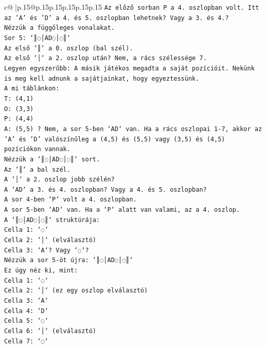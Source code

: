 \documentclass{article}
\begin{document}
{\begin{supertabular}{c@{$\;$}|p{.15\linewidth}@{}p{.15\linewidth}p{.15\linewidth}p{.15\linewidth}p{.15\linewidth}p{.15\linewidth}}
{{{\texttt{Az előző sorban P a 4. oszlopban volt. Itt az 'A' és 'D' a 4. és 5. oszlopban lehetnek? Vagy a 3. és 4.?} \\
\texttt{Nézzük a függőleges vonalakat.} \\
\texttt{Sor 5: `║◌│AD◌│◌║`} \\
\texttt{Az első `║` a 0. oszlop (bal szél).} \\
\texttt{Az első `│` a 2. oszlop után? Nem, a rács szélessége 7.} \\
\texttt{Legyen egyszerűbb: A másik játékos megadta a saját pozícióit. Nekünk is meg kell adnunk a sajátjainkat, hogy egyeztessünk.} \\
\texttt{A mi táblánkon:} \\
\texttt{T: (4,1)} \\
\texttt{O: (3,3)} \\
\texttt{P: (4,4)} \\
\texttt{A: (5,5) ? Nem, a sor 5{-}ben `AD` van. Ha a rács oszlopai 1{-}7, akkor az 'A' és 'D' valószínűleg a (4,5) és (5,5) vagy (3,5) és (4,5) pozíciókon vannak.} \\
\texttt{Nézzük a `║◌│AD◌│◌║` sort.} \\
\texttt{Az `║` a bal szél.} \\
\texttt{A `│` a 2. oszlop jobb szélén?} \\
\texttt{A `AD` a 3. és 4. oszlopban? Vagy a 4. és 5. oszlopban?} \\
\texttt{A sor 4{-}ben `P` volt a 4. oszlopban.} \\
\texttt{A sor 5{-}ben `AD` van. Ha a `P` alatt van valami, az a 4. oszlop.} \\
\texttt{A `║◌│AD◌│◌║` struktúrája:} \\
\texttt{Cella 1: `◌`} \\
\texttt{Cella 2: `│` (elválasztó)} \\
\texttt{Cella 3: `A`? Vagy `◌`?} \\
\texttt{Nézzük a sor 5{-}öt újra: `║◌│AD◌│◌║`} \\
\texttt{Ez úgy néz ki, mint:} \\
\texttt{Cella 1: `◌`} \\
\texttt{Cella 2: `│` (ez egy oszlop elválasztó)} \\
\texttt{Cella 3: `A`} \\
\texttt{Cella 4: `D`} \\
\texttt{Cella 5: `◌`} \\
\texttt{Cella 6: `│` (elválasztó)} \\
\texttt{Cella 7: `◌`} \\
}}}
\end{supertabular}}
\end{document}
